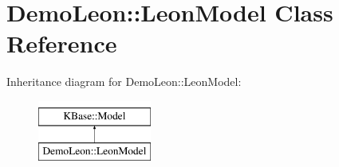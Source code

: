 \hypertarget{class_demo_leon_1_1_leon_model}{\section{Demo\-Leon\-:\-:Leon\-Model Class Reference}
\label{class_demo_leon_1_1_leon_model}
}
Inheritance diagram for Demo\-Leon\-:\-:Leon\-Model\-:\begin{figure}[H]
\begin{center}
\leavevmode
\includegraphics[height=2.000000cm]{class_demo_leon_1_1_leon_model}
\end{center}
\end{figure}
